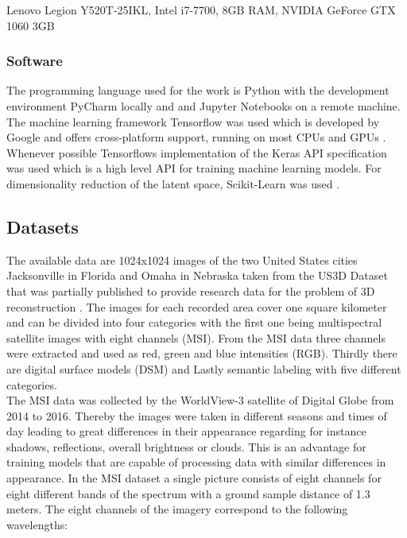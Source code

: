 Lenovo Legion Y520T-25IKL, Intel i7-7700, 8GB RAM, NVIDIA GeForce GTX 1060 3GB

\subsubsection{Software}

The programming language used for the work is Python \parencite{1995-rossum-python} with the development
environment PyCharm locally
and and Jupyter Notebooks on a remote machine. The machine learning framework Tensorflow was used which
is developed by Google and offers cross-platform support, running on most CPUs and GPUs 
\parencite{2015-martin-tensorflow}.
Whenever possible Tensorflows implementation of the Keras API specification was used which is a high level API
for training machine learning models. For dimensionality reduction of the latent space, Scikit-Learn was used
\parencite{2011-pedregosa-scikit}.

\subsection{Datasets} \label{datasets}

The available data are 1024x1024 images of the two United States cities Jacksonville
in Florida and Omaha in Nebraska taken from the US3D Dataset that
was partially published to provide research data for the problem
of 3D reconstruction \parencite{2019-bosch-semantic}.
The images for each recorded area cover one square kilometer and can be divided 
into four categories with the first one being multispectral satellite images with eight channels (MSI). 
From the MSI data three channels were extracted and used as red, green and blue intensities (RGB). 
Thirdly there are digital surface models (DSM) and Lastly semantic labeling with five different categories. \\

The MSI data was collected by the WorldView-3 satellite of Digital Globe from 2014 to 2016.
Thereby the images were taken in different seasons and times of day leading to great differences
in their appearance regarding for instance shadows, reflections, overall brightness or clouds.
This is an advantage for training models that are capable of processing data with similar differences in 
appearance.
In the MSI dataset a single picture consists of eight channels for eight different bands of the spectrum with
a ground sample distance of 1.3 meters. The eight channels of the imagery correspond to the following wavelengths:

